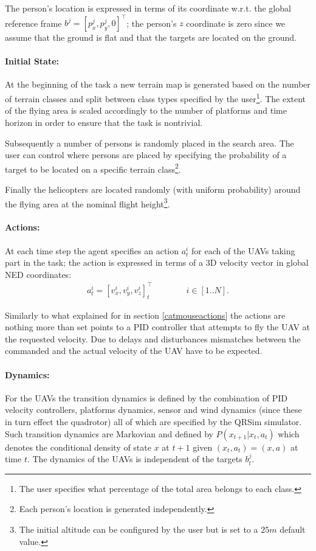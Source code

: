 \documentclass[a4paper,11pt]{report}
\newcommand{\sname}{QRSim\xspace}
\begin{document}
The person's location is expressed in terms of its coordinate w.r.t. the global reference frame  $b^j=[p^j_x,p^j_y,0]^\intercal$; the person's $z$ coordinate is zero since we assume that the ground is flat and that the targets are located on the ground.

\paragraph{Initial State:} At the beginning of the task a new terrain map is generated based on the number of terrain classes and split between class types specified by the user\footnote{The user specifies what percentage of the total area belongs to each class.}. 
The extent of the flying area is scaled accordingly to the number of platforms and time horizon in order to ensure that the task is nontrivial.

Subsequently a number of persons is randomly placed in the search area. The user can control where persons are placed by specifying the probability of a target to be located on a specific terrain class\footnote{Each person's location is generated independently.}. 

Finally the helicopters are located randomly (with uniform probability) around the flying area at the nominal flight height\footnote{The initial altitude can be configured by the user but is set to a $25m$ default value.}.

\paragraph{Actions:}
At each time step the agent specifies an action $a^i_t$ for each of the UAVs taking part in the task; the action is expressed in terms of a 3D velocity vector in global NED coordinates:
\begin{align}
a^i_t=[v^i_x,v^i_y,v^i_z]_t^\intercal \qquad\qquad i\in[1..N].
\end{align}

Similarly to what explained for in section \ref{catmouseactions} the actions are nothing more than set points to a PID controller that attempts to fly the UAV at the requested velocity.
Due to delays and disturbances mismatches between the commanded and the actual velocity of the UAV have to be expected. 

\paragraph{Dynamics:}\label{rescued} For the UAVs the transition dynamics is defined by the combination of PID velocity controllers, platforms dynamics, sensor and wind dynamics (since these in turn effect the quadrotor) all of which are specified by the \sname simulator. Such transition dynamics are Markovian and defined by $P(x_{t+1}|x_t,a_t)$ which denotes the conditional density of state $x$ at $t+1$ given $(x_t,a_t) = (x,a)$ at time $t$.
The dynamics of the UAVs is independent of the targets $b^j_t$.
\end{document}
